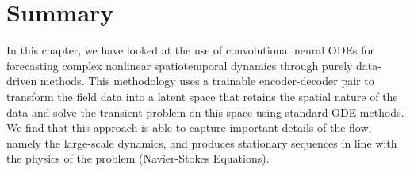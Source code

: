 \documentclass[book.tex]{subfiles}
\begin{document}
\section{Summary}

In this chapter, we have looked at the use of convolutional neural ODEs for forecasting complex nonlinear spatiotemporal dynamics through purely data-driven methods. This methodology uses a trainable encoder-decoder pair to transform the field data into a latent space that retains the spatial nature of the data and solve the transient problem on this space using standard ODE methods. We find that this approach is able to capture important details of the flow, namely the large-scale dynamics, and produces stationary sequences in line with the physics of the problem (Navier-Stokes Equations).

\end{document}

